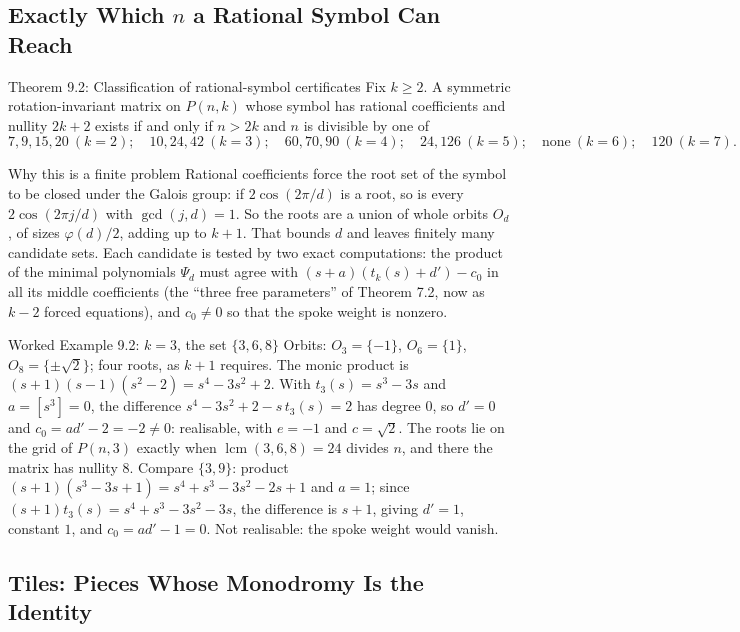 \documentclass[11pt]{article}
\begin{document}
\subsection{Exactly Which $n$ a Rational Symbol Can Reach}

\begin{thmbox}{Theorem 9.2: Classification of rational-symbol certificates}
Fix $k\ge2$. A symmetric rotation-invariant matrix on $P(n,k)$ whose symbol has rational coefficients and nullity $2k+2$ exists if and only if $n>2k$ and $n$ is divisible by one of
\[
  7,9,15,20\ (k=2);\quad 10,24,42\ (k=3);\quad 60,70,90\ (k=4);\quad 24,126\ (k=5);\quad \text{none}\ (k=6);\quad 120\ (k=7).
\]
\end{thmbox}

\begin{intubox}{Why this is a finite problem}
Rational coefficients force the root set of the symbol to be closed under the Galois group: if $2\cos(2\pi/d)$ is a root, so is every $2\cos(2\pi j/d)$ with $\gcd(j,d)=1$. So the roots are a union of whole orbits $O_d$, of sizes $\varphi(d)/2$, adding up to $k+1$. That bounds $d$ and leaves finitely many candidate sets. Each candidate is tested by two exact computations: the product of the minimal polynomials $\Psi_d$ must agree with $(s+a)(t_k(s)+d')-c_0$ in all its middle coefficients (the ``three free parameters'' of Theorem 7.2, now as $k-2$ forced equations), and $c_0\ne0$ so that the spoke weight is nonzero.
\end{intubox}

\begin{callbox}{Worked Example 9.2: $k=3$, the set $\{3,6,8\}$}
Orbits: $O_3=\{-1\}$, $O_6=\{1\}$, $O_8=\{\pm\sqrt2\}$; four roots, as $k+1$ requires. The monic product is $(s+1)(s-1)(s^2-2)=s^4-3s^2+2$. With $t_3(s)=s^3-3s$ and $a=[s^3]=0$, the difference $s^4-3s^2+2-s\,t_3(s)=2$ has degree $0$, so $d'=0$ and $c_0=a d'-2=-2\ne0$: realisable, with $e=-1$ and $c=\sqrt2$. The roots lie on the grid of $P(n,3)$ exactly when $\operatorname{lcm}(3,6,8)=24$ divides $n$, and there the matrix has nullity $8$. Compare $\{3,9\}$: product $(s+1)(s^3-3s+1)=s^4+s^3-3s^2-2s+1$ and $a=1$; since $(s+1)t_3(s)=s^4+s^3-3s^2-3s$, the difference is $s+1$, giving $d'=1$, constant $1$, and $c_0=a d'-1=0$. Not realisable: the spoke weight would vanish.
\end{callbox}

\subsection{Tiles: Pieces Whose Monodromy Is the Identity}
\end{document}
